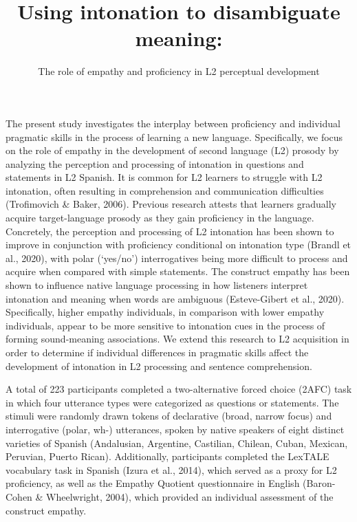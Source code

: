 \documentclass[
  12pt,
]{article}
\title{Using intonation to disambiguate meaning:}
\subtitle{The role of empathy and proficiency in L2 perceptual
development}
\author{}
\date{\vspace{-2.5em}}
\begin{document}
\maketitle

The present study investigates the interplay between proficiency and
individual pragmatic skills in the process of learning a new language.
Specifically, we focus on the role of empathy in the development of
second language (L2) prosody by analyzing the perception and processing
of intonation in questions and statements in L2 Spanish. It is common
for L2 learners to struggle with L2 intonation, often resulting in
comprehension and communication difficulties (Trofimovich \& Baker,
2006). Previous research attests that learners gradually acquire
target-language prosody as they gain proficiency in the language.
Concretely, the perception and processing of L2 intonation has been
shown to improve in conjunction with proficiency conditional on
intonation type (Brandl et al., 2020), with polar (`yes/no')
interrogatives being more difficult to process and acquire when compared
with simple statements. The construct empathy has been shown to
influence native language processing in how listeners interpret
intonation and meaning when words are ambiguous (Esteve-Gibert et al.,
2020). Specifically, higher empathy individuals, in comparison with
lower empathy individuals, appear to be more sensitive to intonation
cues in the process of forming sound-meaning associations. We extend
this research to L2 acquisition in order to determine if individual
differences in pragmatic skills affect the development of intonation in
L2 processing and sentence comprehension.

A total of 223 participants completed a two-alternative forced choice
(2AFC) task in which four utterance types were categorized as questions
or statements. The stimuli were randomly drawn tokens of declarative
(broad, narrow focus) and interrogative (polar, wh-) utterances, spoken
by native speakers of eight distinct varieties of Spanish (Andalusian,
Argentine, Castilian, Chilean, Cuban, Mexican, Peruvian, Puerto Rican).
Additionally, participants completed the LexTALE vocabulary task in
Spanish (Izura et al., 2014), which served as a proxy for L2
proficiency, as well as the Empathy Quotient questionnaire in English
(Baron-Cohen \& Wheelwright, 2004), which provided an individual
assessment of the construct empathy.
\end{document}
